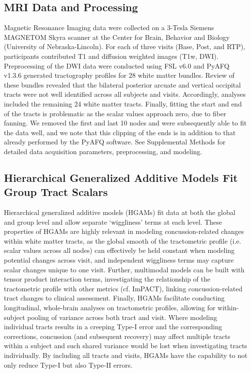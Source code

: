 \documentclass[12pt]{article}
\begin{document}
\subsection{MRI Data and Processing}
\label{ssec:meth-mri}
Magnetic Resonance Imaging data were collected on a 3-Tesla Siemens MAGNETOM Skyra scanner at the Center for Brain, Behavior and Biology (University of Nebraska-Lincoln). For each of three visits (Base, Post, and RTP), participants contributed T1 and diffusion weighted images (T1w, DWI). Preprocessing of the DWI data were conducted using FSL v6.0 \autocite{jenkinson2012Fsl} and PyAFQ v1.3.6 \autocite{kruper2021EvaluatingReliabilityHuman,yeatman2012TractProfilesWhite} generated tractography profiles for 28 white matter bundles. Review of these bundles revealed that the bilateral posterior arcuate and vertical occipital tracts were not well identified across all subjects and visits. Accordingly, analyses included the remaining 24 white matter tracts. Finally, fitting the start and end of the tracts is problematic as the scalar values approach zero, due to fiber fanning. We removed the first and last 10 nodes and were subsequently able to fit the data well, and we note that this clipping of the ends is in addition to that already performed by the PyAFQ software. See Supplemental Methods for detailed data acquisition parameters, preprocessing, and modeling.


\subsection{Hierarchical Generalized Additive Models Fit Group Tract Scalars}
\label{ssec:meth-gam}
Hierarchical generalized additive models (HGAMs) \autocite{pedersen2019HierarchicalGeneralizedAdditive} fit data at both the global and group level and allow separate `wiggliness' terms at each level. These properties of HGAMs are highly relevant in modeling concussion-related changes within white matter tracts, as the global smooth of the tractometric profile (i.e. scalar values across all nodes) can effectively be held constant when modeling potential changes across visit, and independent wiggliness terms may capture scalar changes unique to one visit. Further, multimodal models can be built with tensor product interaction terms, investigating the relationship of the tractometric profile with other metrics (cf. ImPACT), linking concussion-related tract changes to clinical assessment. Finally, HGAMs facilitate conducting longitudinal, whole-brain analyses on tractometric profiles, allowing for within-subject pooling of variance across both tract and visit. Where modeling individual tracts results in a creeping Type-I error and the corresponding corrections, concussion (and subsequent recovery) may affect multiple tracts within a subject and such shared variance would be lost when investigating tracts individually. By including all tracts and visits, HGAMs have the capability to not only reduce Type-I but also Type-II errors.
\end{document}
